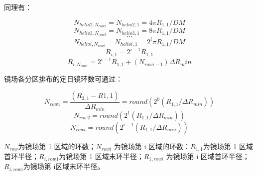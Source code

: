 \documentclass[withoutpreface,bwprint]{cumcmthesis} %
\begin{document}
同理有：

$$N_{helio2,N_{row2}}=N_{helio2,1}=4\pi R_{1,1}/DM$$
$$N_{helio3,N_{row3}}=N_{helio3,1}=8\pi R_{1,1}/DM$$
$$\ldots$$
$$N_{helioi,N_{rowi}}=N_{helioi,1}=2^{i}\pi R_{1,1}/DM$$
$$R_{i,1}=2^{i-1}R_{1,1}$$
$$R_{i,N_{rowi}}=2^{i-1}R_{1,1}+(N_{rowi-1})\Delta R_min$$

镜场各分区排布的定日镜环数可通过：

$$N_{row1}=\frac{(R_{2,1}-R{1,1})}{\Delta R_{min}}=round(2^0(R_{1,1}/\Delta R_{min}))$$
$$N_{row2}=round(2^1(R_{1,1}/\Delta R_{min}))$$
$$N_{rowi}=round(2^{i-1}(R_{1,1}/\Delta R_{min}))$$

$N_{row}$为镜场第 1 区域的环数；$N_{rowi}$ 为镜场第 i 区域的环数：$R_{1,1}$为镜场第 1 区域首环半径；$R_{i,row1}$为镜场第 1 区域末环半径；$R_{1,rowi}$ 为镜场第 i 区域首环半径；$R_{i,rowi}$为镜场第 i区域末环半径。
\end{document}
